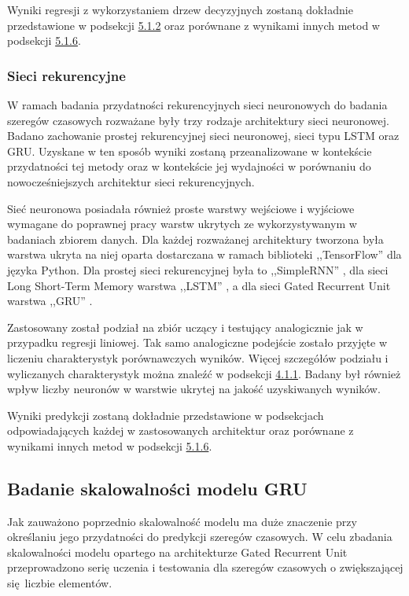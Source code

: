 \documentclass[10pt,a4paper]{article}
\begin{document}
Wyniki regresji z wykorzystaniem drzew decyzyjnych zostaną dokładnie przedstawione w podsekcji \hyperlink{5.1.2}{5.1.2} oraz porównane z wynikami innych metod w podsekcji \hyperlink{5.1.6}{5.1.6}.

\subsubsection{Sieci rekurencyjne}
W ramach badania przydatności rekurencyjnych sieci neuronowych do badania szeregów czasowych rozważane były trzy rodzaje architektury sieci neuronowej. Badano zachowanie prostej rekurencyjnej sieci neuronowej, sieci typu LSTM oraz GRU. Uzyskane w ten sposób wyniki zostaną przeanalizowane w kontekście przydatności tej metody oraz w kontekście jej wydajności w porównaniu do nowocześniejszych architektur sieci rekurencyjnych. 

Sieć neuronowa posiadała również proste warstwy wejściowe i wyjściowe wymagane do poprawnej pracy warstw ukrytych ze wykorzystywanym w badaniach zbiorem danych.
Dla każdej rozważanej architektury tworzona była warstwa ukryta na niej oparta dostarczana w ramach biblioteki ,,TensorFlow'' dla języka Python. Dla prostej sieci rekurencyjnej była to ,,SimpleRNN'' \cite{tfSimpleRNN}, dla sieci Long Short-Term Memory  warstwa ,,LSTM'' \cite{tfLSTM}, a dla sieci Gated Recurrent Unit warstwa ,,GRU'' \cite{tfGRU}.

Zastosowany został podział na zbiór uczący i testujący analogicznie jak w przypadku regresji liniowej. Tak samo analogiczne podejście zostało przyjęte w liczeniu charakterystyk porównawczych wyników. Więcej szczegółów podziału i wyliczanych charakterystyk można znaleźć w podsekcji \hyperlink{subsubsection.4.1.1}{4.1.1}.
Badany był również wpływ liczby neuronów w warstwie ukrytej na jakość uzyskiwanych wyników. 

Wyniki predykcji zostaną dokładnie przedstawione w podsekcjach odpowiadających każdej w zastosowanych architektur oraz porównane z wynikami innych metod w podsekcji \hyperlink{5.1.6}{5.1.6}.


\subsection{Badanie skalowalności modelu GRU}
Jak zauważono poprzednio skalowalność modelu ma duże znaczenie przy określaniu jego przydatności do predykcji szeregów czasowych. W celu zbadania skalowalności modelu opartego na architekturze Gated Recurrent Unit przeprowadzono serię uczenia i testowania dla szeregów czasowych o zwiększającej się liczbie elementów. 
\end{document}
